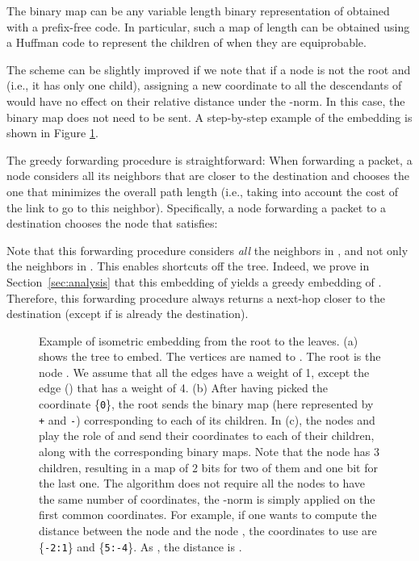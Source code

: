 \documentclass[conference]{IEEEtran}
\begin{document}
The binary map  can be any variable length binary representation of  obtained with a prefix-free code. In particular, such a map of length  can be obtained using a Huffman code to represent the  children of  when they are equiprobable.

The scheme can be slightly improved if we note that if a node  is not the root and  (i.e., it has only one child), assigning a new coordinate to all the descendants of  would have no effect on their relative distance under the -norm. In this case, the binary map does not need to be sent. A step-by-step example of the embedding is shown in Figure \ref{fig:example}.

The greedy forwarding procedure is straightforward: When forwarding a packet, a node considers all its neighbors that are closer to the destination and chooses the one that minimizes the overall path length (i.e., taking into account the cost of the link to go to this neighbor). Specifically, a node  forwarding a packet to a destination  chooses the node that satisfies:

Note that this forwarding procedure considers \emph{all} the neighbors in , and not only the neighbors in . This enables shortcuts off the tree.
Indeed,
we prove in Section~\ref{sec:analysis} that this embedding of  yields a greedy embedding of . Therefore, this forwarding procedure always returns a next-hop closer to the destination (except if  is already the destination).

\begin{figure}
\vspace{0.1in}
\centering
{}\hfil
{}\hfil
{}
\caption{Example of isometric embedding from the root to the leaves. (a) shows the tree to embed. 
The vertices are named  to . The root is the node . We assume that all the edges have a weight of 1, except the edge () that has a weight of 4. (b) After having picked the coordinate \{\texttt{0}\}, the root sends the binary map (here represented by \texttt{+} and \texttt{-}) corresponding to each of its children. In (c), the nodes  and  play the role of  and send their coordinates to each of their children, along with the corresponding binary maps. Note that the node  has 3 children, resulting in a map of 2 bits for two of them and one bit for the last one. The algorithm does not require all the nodes to have the same number of coordinates, the -norm is simply applied on the first common coordinates. For example, if one wants to compute the distance between the node  and the node , the coordinates to use are \{\texttt{-2:1}\} and \{\texttt{5:-4}\}. As , the distance is .}
\vspace{-1.2em}
\label{fig:example}
\end{figure}
\end{document}
